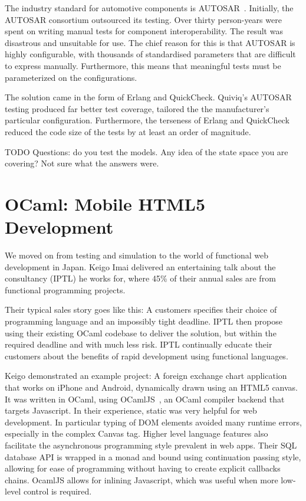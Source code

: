 \documentclass{jfp1}
\begin{document}
The industry standard for automotive components is AUTOSAR~\cite{x}.
Initially, the AUTOSAR consortium outsourced its testing.  Over thirty
person-years were spent on writing manual tests for component
interoperability.  The result was disastrous and unsuitable for use.
The chief reason for this is that AUTOSAR is highly configurable, with
thousands of standardised parameters that are difficult to express
manually.  Furthermore, this means that meaningful tests must be
parameterized on the configurations.

The solution came in the form of Erlang and QuickCheck.  Quiviq's
AUTOSAR testing produced far better test coverage, tailored the the
manufacturer's particular configuration.  Furthermore, the terseness of
Erlang and QuickCheck reduced the code size of the tests by at least an
order of magnitude.

TODO Questions: do you test the models.  Any idea of the state space you
are covering?  Not sure what the answers were.

\section{OCaml: Mobile HTML5 Development}

We moved on from testing and simulation to the world of functional web
development in Japan. Keigo Imai delivered an entertaining talk about
the consultancy (IPTL) he works for, where 45\% of their annual sales
are from functional programming projects.

Their typical sales story goes like this: A customers specifies their
choice of programming language and an impossibly tight deadline.  IPTL
then propose using their existing OCaml codebase to deliver the
solution, but within the required deadline and with much less risk.
IPTL continually educate their customers about the benefits of rapid
development using functional languages.

Keigo demonstrated an example project: A foreign exchange chart
application that works on iPhone and Android, dynamically drawn using
an HTML5 canvas.  It was written in OCaml, using OCamlJS~\cite{x}, an
OCaml compiler backend that targets Javascript.  In their experience,
static was very helpful for web development.  In particular typing of
DOM elements avoided many runtime errors, especially in the complex
Canvas tag.  Higher level language features also facilitate the
asynchronous programming style prevalent in web apps.  Their SQL
database API is wrapped in a monad and bound using continuation
passing style, allowing for ease of programming without having to
create explicit callbacks chains.  OcamlJS allows for inlining
Javascript, which was useful when more low-level control is required.
\end{document}

